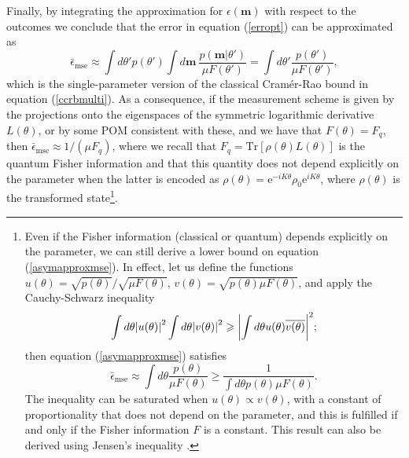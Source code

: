 Finally, by integrating the approximation for $\epsilon(\boldsymbol{m})$ with respect to the outcomes we conclude that the error in equation (\ref{erropt}) can be approximated as
\begin{equation}
\bar{\epsilon}_{\mathrm{mse}} \approx \int d\theta' p(\theta')  \int d\boldsymbol{m} ~\frac{p(\boldsymbol{m}|\theta')}{\mu F(\theta')} = \int d\theta' \frac{p(\theta') }{\mu F(\theta')},
\label{asymapproxmse}
\end{equation}
which is the single-parameter version of the classical Cram\'{e}r-Rao bound in equation (\ref{ccrbmulti}). As a consequence, if the measurement scheme is given by the projections onto the eigenspaces of the symmetric logarithmic derivative $L(\theta)$, or by some POM consistent with these, and we have that $F(\theta) = F_q$, then $\bar{\epsilon}_{\mathrm{mse}} \approx 1/(\mu F_q)$, where we recall that $F_q = \mathrm{Tr}[\rho(\theta)L(\theta)]$ is the quantum Fisher information and that this quantity does not depend explicitly on the parameter when the latter is encoded as $\rho(\theta)=\mathrm{e}^{-i K \theta}\rho_0 \mathrm{e}^{i K \theta}$, where $\rho(\theta)$ is the transformed state\footnote{Even if the Fisher information (classical or quantum) depends explicitly on the parameter, we can still derive a lower bound on equation (\ref{asymapproxmse}). In effect, let us define the functions $u(\theta) = \sqrt{p(\theta)}/\sqrt{\mu F(\theta)}$, $v(\theta) = \sqrt{p(\theta)\mu F(\theta)}$, and apply the Cauchy-Schwarz inequality \cite{mathematics2004}
\begin{equation}
\int d\theta \abs{u(\theta)}^2  \int d\theta \abs{v(\theta)}^2 \geqslant \abs{\int d\theta u(\theta) \overline{v(\theta)}}^2; 
\nonumber
\end{equation}
then equation (\ref{asymapproxmse}) satisfies 
\begin{equation}
\bar{\epsilon}_{\mathrm{mse}} \approx \int d\theta \frac{p(\theta)}{\mu F(\theta)} \geqslant \frac{1}{\int d\theta p(\theta)\mu F(\theta)}.
\nonumber
\label{priorind}
\end{equation}
The inequality can be saturated when $u(\theta) \propto v(\theta)$, with a constant of proportionality that does not depend on the parameter, and this is fulfilled if and only if the Fisher information $F$ is a constant. This result can also be derived using Jensen's inequality \cite{kolodynski2014}.}. 

